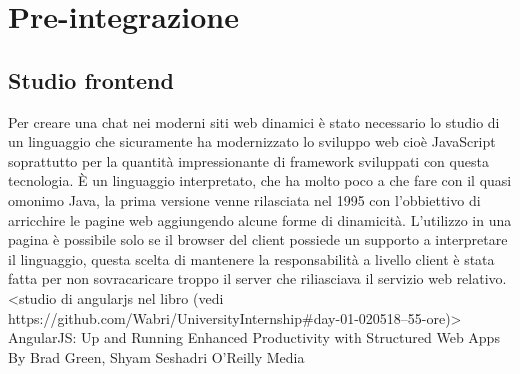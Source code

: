 \chapter{Pre-integrazione}


\section{Studio frontend}
Per creare una chat nei moderni siti web dinamici è stato necessario lo studio di un linguaggio che sicuramente ha modernizzato lo sviluppo web cioè JavaScript soprattutto per la quantità impressionante di framework sviluppati con questa tecnologia.
È un linguaggio interpretato, che ha molto poco a che fare con il quasi omonimo Java, la prima versione venne rilasciata nel 1995 con l'obbiettivo di arricchire le pagine web aggiungendo alcune forme di dinamicità. L'utilizzo in una pagina è possibile solo se il browser del client possiede un supporto a interpretare il linguaggio, questa scelta di mantenere la responsabilità a livello client è stata fatta per non sovracaricare troppo il server che riliasciava il servizio web relativo.
\iffalse
<studio di angularjs nel libro (vedi https://github.com/Wabri/UniversityInternship#day-01-020518--55-ore)>
AngularJS: Up and Running
Enhanced Productivity with Structured Web Apps
By Brad Green, Shyam Seshadri
O'Reilly Media

